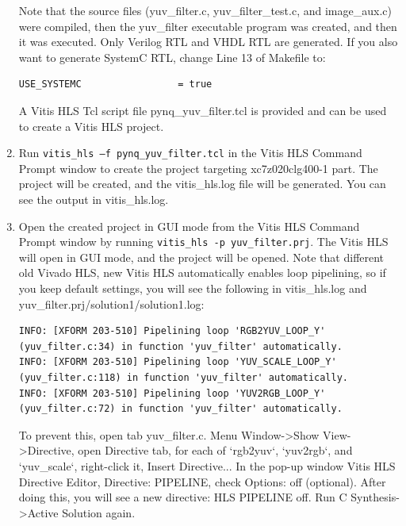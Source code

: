 \documentclass[a4paper,12pt,twoside]{article}
\begin{document}
\begin{enumerate}
\begin{verbatim}
    \end{verbatim}
    Note that the source files (yuv\_filter.c, yuv\_filter\_test.c, and image\_aux.c) were compiled, then the yuv\_filter executable program was created, and then it was executed. Only Verilog RTL and VHDL RTL are generated. If you also want to generate SystemC RTL, change Line 13 of Makefile to:
    \begin{verbatim}
USE_SYSTEMC 				= true
    \end{verbatim}
    A Vitis HLS Tcl script file pynq\_yuv\_filter.tcl is provided and can be used to create a Vitis HLS project.
    \item Run \texttt{vitis\_hls –f pynq\_yuv\_filter.tcl} in the Vitis HLS Command Prompt window to create the project targeting xc7z020clg400-1 part. The project will be created, and the vitis\_hls.log file will be generated. You can see the output in vitis\_hls.log.
    \item Open the created project in GUI mode from the Vitis HLS Command Prompt window by running \texttt{vitis\_hls -p yuv\_filter.prj}. The Vitis HLS will open in GUI mode, and the project will be opened. Note that different old Vivado HLS, new Vitis HLS automatically enables loop pipelining, so if you keep default settings, you will see the following in vitis\_hls.log and yuv\_filter.prj/solution1/solution1.log:
    \begin{verbatim}
INFO: [XFORM 203-510] Pipelining loop 'RGB2YUV_LOOP_Y' (yuv_filter.c:34) in function 'yuv_filter' automatically.
INFO: [XFORM 203-510] Pipelining loop 'YUV_SCALE_LOOP_Y' (yuv_filter.c:118) in function 'yuv_filter' automatically.
INFO: [XFORM 203-510] Pipelining loop 'YUV2RGB_LOOP_Y' (yuv_filter.c:72) in function 'yuv_filter' automatically.
    \end{verbatim}
    To prevent this, open tab yuv\_filter.c. Menu Window->Show View->Directive, open Directive tab, for each of `rgb2yuv`, `yuv2rgb`, and `yuv\_scale`, right-click it, Insert Directive... In the pop-up window Vitis HLS Directive Editor, Directive: PIPELINE, check Options: off (optional). After doing this, you will see a new directive: HLS PIPELINE off. Run C Synthesis->Active Solution again.
\end{enumerate}
\end{document}
